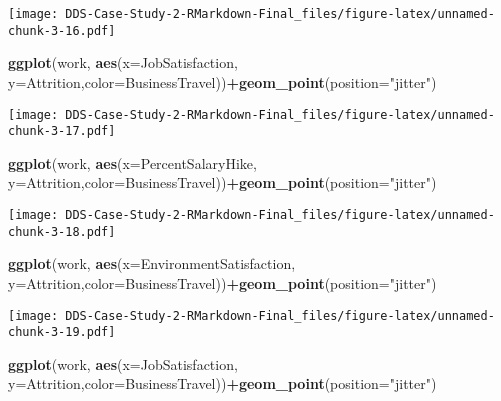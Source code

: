 \documentclass[]{article}
\newenvironment{Shaded}{\begin{snugshade}}{\end{snugshade}}
\newcommand{\DataTypeTok}[1]{\textcolor[rgb]{0.13,0.29,0.53}{#1}}
\newcommand{\KeywordTok}[1]{\textcolor[rgb]{0.13,0.29,0.53}{\textbf{#1}}}
\newcommand{\NormalTok}[1]{#1}
\newcommand{\OperatorTok}[1]{\textcolor[rgb]{0.81,0.36,0.00}{\textbf{#1}}}
\newcommand{\StringTok}[1]{\textcolor[rgb]{0.31,0.60,0.02}{#1}}
\begin{document}
\texttt{[image: DDS-Case-Study-2-RMarkdown-Final\_files/figure-latex/unnamed-chunk-3-16.pdf]}

\begin{Shaded}
\begin{Highlighting}[]
\KeywordTok{ggplot}\NormalTok{(work, }\KeywordTok{aes}\NormalTok{(}\DataTypeTok{x=}\NormalTok{JobSatisfaction, }\DataTypeTok{y=}\NormalTok{Attrition,}\DataTypeTok{color=}\NormalTok{BusinessTravel))}\OperatorTok{+}\KeywordTok{geom_point}\NormalTok{(}\DataTypeTok{position=}\StringTok{"jitter"}\NormalTok{)}
\end{Highlighting}
\end{Shaded}

\texttt{[image: DDS-Case-Study-2-RMarkdown-Final\_files/figure-latex/unnamed-chunk-3-17.pdf]}

\begin{Shaded}
\begin{Highlighting}[]
\KeywordTok{ggplot}\NormalTok{(work, }\KeywordTok{aes}\NormalTok{(}\DataTypeTok{x=}\NormalTok{PercentSalaryHike, }\DataTypeTok{y=}\NormalTok{Attrition,}\DataTypeTok{color=}\NormalTok{BusinessTravel))}\OperatorTok{+}\KeywordTok{geom_point}\NormalTok{(}\DataTypeTok{position=}\StringTok{"jitter"}\NormalTok{)}
\end{Highlighting}
\end{Shaded}

\texttt{[image: DDS-Case-Study-2-RMarkdown-Final\_files/figure-latex/unnamed-chunk-3-18.pdf]}

\begin{Shaded}
\begin{Highlighting}[]
\KeywordTok{ggplot}\NormalTok{(work, }\KeywordTok{aes}\NormalTok{(}\DataTypeTok{x=}\NormalTok{EnvironmentSatisfaction, }\DataTypeTok{y=}\NormalTok{Attrition,}\DataTypeTok{color=}\NormalTok{BusinessTravel))}\OperatorTok{+}\KeywordTok{geom_point}\NormalTok{(}\DataTypeTok{position=}\StringTok{"jitter"}\NormalTok{)}
\end{Highlighting}
\end{Shaded}

\texttt{[image: DDS-Case-Study-2-RMarkdown-Final\_files/figure-latex/unnamed-chunk-3-19.pdf]}

\begin{Shaded}
\begin{Highlighting}[]
\KeywordTok{ggplot}\NormalTok{(work, }\KeywordTok{aes}\NormalTok{(}\DataTypeTok{x=}\NormalTok{JobSatisfaction, }\DataTypeTok{y=}\NormalTok{Attrition,}\DataTypeTok{color=}\NormalTok{BusinessTravel))}\OperatorTok{+}\KeywordTok{geom_point}\NormalTok{(}\DataTypeTok{position=}\StringTok{"jitter"}\NormalTok{)}
\end{Highlighting}
\end{Shaded}
\end{document}
